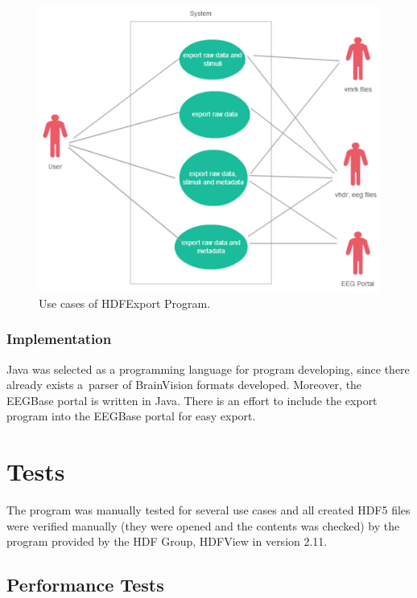 \documentclass[conference]{IEEEtran}
\begin{document}
\begin{figure}
	\includegraphics[scale=0.5]{obrazky/use_case_data.pdf}	
	\caption{Use cases of HDFExport Program.}
	\label{use_case2}
\end{figure}


\subsubsection {Implementation}

Java was selected as a programming language for program developing, since there already exists a~parser of BrainVision formats developed. Moreover, the EEGBase portal is written in Java. There is an effort to include the export program into the EEGBase portal for easy export.

\section{Tests}

The program was manually tested for several use cases and all created HDF5 files were verified manually (they were opened and the contents was checked) by the program provided by the HDF Group, HDFView \cite{hdfjava} in version 2.11.

\subsection{Performance Tests}
\end{document}
